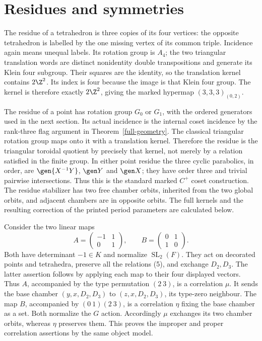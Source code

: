 \section{Residues and symmetries}

The residue of a tetrahedron is three copies of its four vertices:
the opposite tetrahedron is labelled by the one missing vertex
of its common triple. Incidence again means unequal labels.
Its rotation group is $A_4$; the two triangular translation words
are distinct nonidentity double transpositions and generate its
Klein four subgroup. Their squares are the identity, so the
translation kernel contains $2\Z^2$. Its index is four because
the image is that Klein four group. The kernel is therefore
exactly $2\Z^2$, giving the marked hypermap $(3,3,3)_{(0,2)}$.

The residue of a point has rotation group $G_0$ or $G_1$, with
the ordered generators used in the next section. Its actual
incidence is the internal coset incidence by the rank-three flag
argument in Theorem~\ref{full-geometry}. The classical triangular
rotation group maps onto it with a translation kernel. Therefore
the residue is the triangular toroidal quotient by precisely that
kernel, not merely by a relation satisfied in the finite group.
In either point residue the three cyclic parabolics, in order,
are $\gen{X^{-1}Y}$, $\gen Y$ and $\gen X$; they have order
three and trivial pairwise intersections. Thus this is the
standard marked $C^+$ coset construction. The residue stabilizer
has two free chamber orbits, inherited from the two global orbits,
and adjacent chambers are in opposite orbits.
The full kernels and the resulting correction of the printed
period parameters are calculated below.

Consider the two linear maps
\[
       A=\begin{pmatrix}-1&1\\0&1\end{pmatrix},\qquad
       B=\begin{pmatrix}0&1\\1&0\end{pmatrix}.
\]
Both have determinant $-1\in K$ and normalize $\operatorname{SL}_2(F)$.
They act on decorated points and tetrahedra, preserve all the
relations (5), and exchange $D_2,D_3$. The latter assertion
follows by applying each map to their four displayed vectors.
Thus $A$, accompanied by the type permutation $(2\ 3)$, is a
correlation $\mu$. It sends the base chamber
$(y,x,D_2,D_3)$ to $(z,x,D_2,D_3)$, its type-zero neighbour.
The map $B$, accompanied by $(0\ 1)(2\ 3)$, is a correlation
$\eta$ fixing the base chamber as a set. Both normalize the
$G$ action. Accordingly $\mu$ exchanges its two chamber orbits,
whereas $\eta$ preserves them. This proves the improper and
proper correlation assertions by the same object model.

